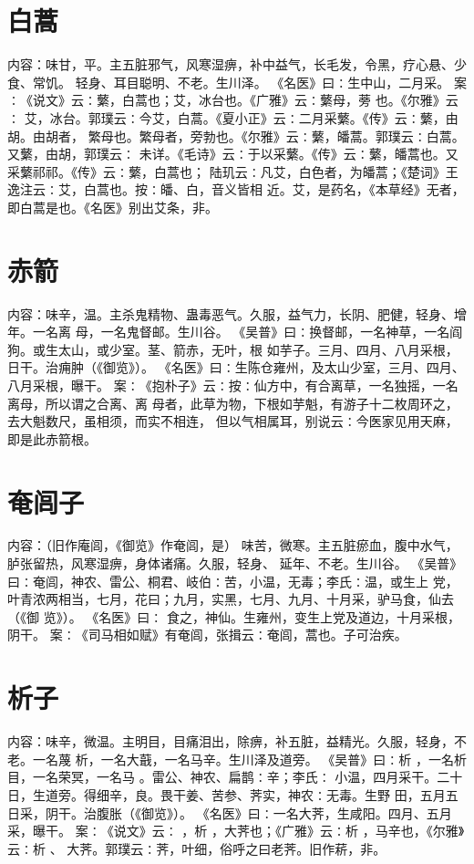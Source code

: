 \documentclass[12pt,UTF8]{ctexbook}
\begin{document}
\section{白蒿}
内容：味甘，平。主五脏邪气，风寒湿痹，补中益气，长毛发，令黑，疗心悬、少食、常饥。 
轻身、耳目聪明、不老。生川泽。 
《名医》曰∶生中山，二月采。 
案∶《说文》云∶蘩，白蒿也；艾，冰台也。《广雅》云∶蘩母，蒡 也。《尔雅》云∶ 
艾，冰台。郭璞云∶今艾，白蒿。《夏小正》云∶二月采蘩。《传》云∶蘩，由胡。由胡者， 
繁母也。繁母者，旁勃也。《尔雅》云∶蘩，皤蒿。郭璞云∶白蒿。又蘩，由胡，郭璞云∶ 
未详。《毛诗》云∶于以采蘩。《传》云∶蘩，皤蒿也。又采蘩祁祁。《传》云∶蘩，白蒿也； 
陆玑云∶凡艾，白色者，为皤蒿；《楚词》王逸注云∶艾，白蒿也。按∶皤、白，音义皆相 
近。艾，是药名，《本草经》无者，即白蒿是也。《名医》别出艾条，非。 


\section{赤箭}
内容：味辛，温。主杀鬼精物、蛊毒恶气。久服，益气力，长阴、肥健，轻身、增年。一名离 
母，一名鬼督邮。生川谷。 
《吴普》曰∶换督邮，一名神草，一名阎狗。或生太山，或少室。茎、箭赤，无叶，根 
如芋子。三月、四月、八月采根，日干。治痈肿（《御览》）。 
《名医》曰∶生陈仓雍州，及太山少室，三月、四月、八月采根，曝干。 
案∶《抱朴子》云∶按∶仙方中，有合离草，一名独摇，一名离母，所以谓之合离、离 
母者，此草为物，下根如芋魁，有游子十二枚周环之，去大魁数尺，虽相须，而实不相连， 
但以气相属耳，别说云∶今医家见用天麻，即是此赤箭根。 


\section{奄闾子}
内容：（旧作庵闾，《御览》作奄闾，是） 
味苦，微寒。主五脏瘀血，腹中水气，胪张留热，风寒湿痹，身体诸痛。久服，轻身、 
延年、不老。生川谷。 
《吴普》曰∶奄闾，神农、雷公、桐君、岐伯∶苦，小温，无毒；李氏∶温，或生上 
党，叶青浓两相当，七月，花曰；九月，实黑，七月、九月、十月采，驴马食，仙去（《御 
览》）。 
《名医》曰∶ 食之，神仙。生雍州，变生上党及道边，十月采根，阴干。 
案∶《司马相如赋》有奄闾，张揖云∶奄闾，蒿也。子可治疾。 


\section{析子}
内容：味辛，微温。主明目，目痛泪出，除痹，补五脏，益精光。久服，轻身，不老。一名蔑 
析，一名大蕺，一名马辛。生川泽及道旁。 
《吴普》曰∶析 ，一名析目，一名荣冥，一名马 。雷公、神农、扁鹊∶辛；李氏∶ 
小温，四月采干。二十日，生道旁。得细辛，良。畏干姜、苦参、荠实，神农∶无毒。生野 
田，五月五日采，阴干。治腹胀（《御览》）。 
《名医》曰∶一名大荠，生咸阳。四月、五月采，曝干。 
案∶《说文》云∶ ，析 ，大荠也；《广雅》云∶析 ，马辛也，《尔雅》云∶析 、 
大荠。郭璞云∶荠，叶细，俗呼之曰老荠。旧作菥，非。 
\end{document}
